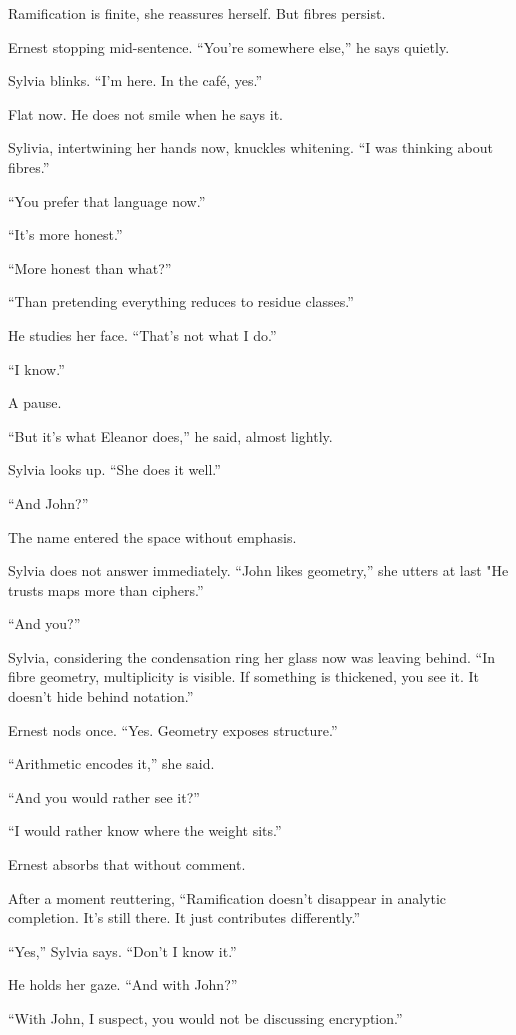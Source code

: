 Ramification is finite, she reassures herself. But fibres persist.

Ernest stopping mid-sentence. “You’re somewhere else,” he says quietly.

Sylvia blinks. “I’m here. In the café, yes.”

Flat now. He does not smile when he says it.

Sylivia, intertwining her hands now, knuckles whitening.
“I was thinking about fibres.”

“You prefer that language now.”

“It’s more honest.”

“More honest than what?”

“Than pretending everything reduces to residue classes.”

He studies her face. “That’s not what I do.”

“I know.”

A pause.

“But it’s what Eleanor does,” he said, almost lightly.

Sylvia looks up. “She does it well.”

“And John?”

The name entered the space without emphasis.

Sylvia does not answer immediately. “John likes geometry,” she utters at last "He trusts maps more than ciphers.”

“And you?”

Sylvia, considering the condensation ring her glass now was leaving behind. “In fibre geometry, multiplicity is visible. If something is thickened, you see it. It doesn’t hide behind notation.”

Ernest nods once. “Yes. Geometry exposes structure.”

“Arithmetic encodes it,” she said.

“And you would rather see it?”

“I would rather know where the weight sits.”

Ernest absorbs that without comment.

After a moment reuttering, “Ramification doesn’t disappear in analytic completion. It’s still there. It just contributes differently.”

“Yes,” Sylvia says. “Don't I know it.”

He holds her gaze. “And with John?” 

“With John, I suspect, you would not be discussing encryption.”

